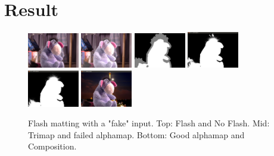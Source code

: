 \documentclass[10pt,letterpaper,twocolumn]{article}
\begin{document}
\section{Result}
\begin{figure}[h!]

  \centering
    \includegraphics[width=0.2\textwidth]{GT24noflash.png}
    \includegraphics[width=0.2\textwidth]{GT24flash.png}
        \includegraphics[width=0.2\textwidth]{GT24trimap.png}
            \includegraphics[width=0.2\textwidth]{nooo.png}
           \includegraphics[width=0.2\textwidth]{alphamapp.png}
           \includegraphics[width=0.2\textwidth]{igorparis.png}      
           \label{fig:igor}     
      \caption{Flash matting with a "fake" input. Top: Flash and No Flash. Mid: Trimap and failed alphamap. Bottom: Good alphamap and Composition.}
\end{figure}
\end{document}
